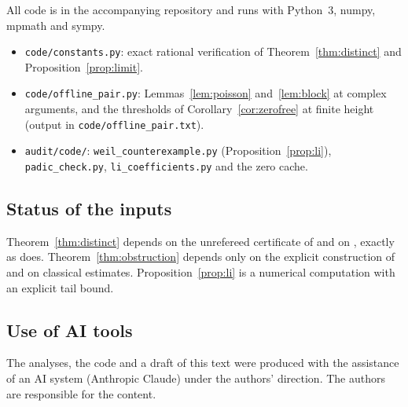 \documentclass[reqno,11pt]{amsart}
\numberwithin{equation}{section}
\theoremstyle{plain}
\theoremstyle{remark}
\begin{document}
All code is in the accompanying repository and runs with Python~3, numpy,
mpmath and sympy.
\begin{itemize}
\item \texttt{code/constants.py}: exact rational verification of
Theorem~\ref{thm:distinct} and Proposition~\ref{prop:limit}.
\item \texttt{code/offline\_pair.py}: Lemmas~\ref{lem:poisson}
and~\ref{lem:block} at complex arguments, and the thresholds of
Corollary~\ref{cor:zerofree} at finite height (output in
\texttt{code/offline\_pair.txt}).
\item \texttt{audit/code/}: \texttt{weil\_counterexample.py}
(Proposition~\ref{prop:li}), \texttt{padic\_check.py},
\texttt{li\_coefficients.py} and the zero cache.
\end{itemize}

\subsection*{Status of the inputs}
Theorem~\ref{thm:distinct} depends on the unrefereed certificate of
\cite{TRM26} and on \cite{BGST24}, exactly as \cite{Kna26} does.
Theorem~\ref{thm:obstruction} depends only on the explicit construction of
\cite{C26,YY26a} and on classical estimates. Proposition~\ref{prop:li} is a
numerical computation with an explicit tail bound.

\subsection*{Use of AI tools}
The analyses, the code and a draft of this text were produced with the
assistance of an AI system (Anthropic Claude) under the authors' direction.
The authors are responsible for the content.
\end{document}
